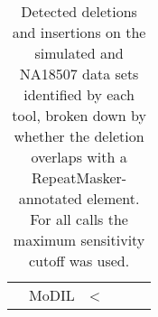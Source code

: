 \begin{table}
\begin{center}
\begin{tabular}{r|r|rr|rr}
&  MoDIL      & <%
\hline
\end{tabular}
\end{center}
\caption{Detected deletions and insertions on the simulated and NA18507 data sets identified by each tool, broken down by whether the deletion overlaps with a RepeatMasker-annotated element. For all calls the maximum sensitivity cutoff was used.}
\label{predsByRepmask}
\end{table}
